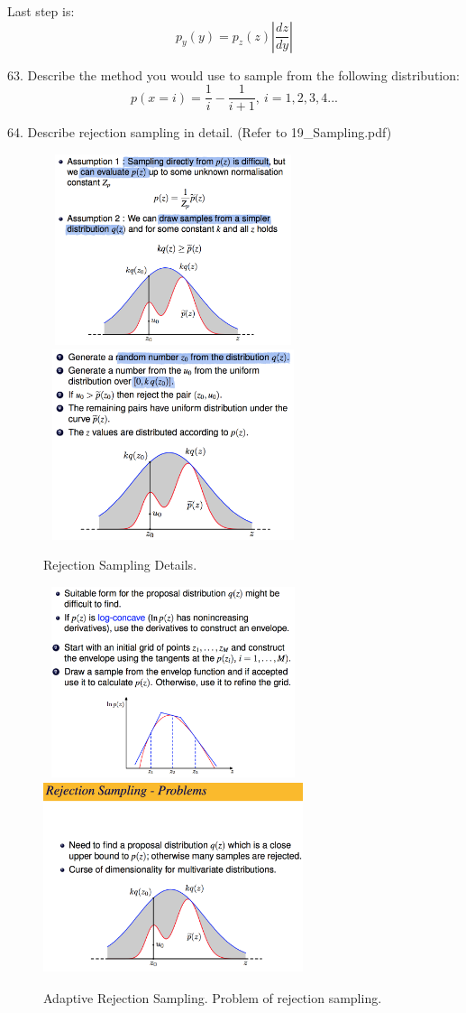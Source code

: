 \documentclass[11pt,a4paper]{article}
\begin{document}
Last step is:
$$ p_y (y) = p_z (z) | \frac{dz}{dy}| $$

63. Describe the method you would use to sample from the following distribution:
$$ p(x=i) = \frac{1}{i} - \frac{1}{i+1},\ i = 1,2,3,4 ...$$

64. Describe rejection sampling in detail. (Refer to 19\_Sampling.pdf)
\begin{figure}[H] \centering
    \includegraphics[width=3in,height=2.2in]{./figure/rejectSampling_1.png}
    \includegraphics[width=3in,height=2.2in]{./figure/rejectSampling_2.png} \\
    \caption{Rejection Sampling Details.}
\end{figure}
\begin{figure}[H] \centering
    \includegraphics[width=3in,height=2.2in]{./figure/rejectSampling_3.png}
    \includegraphics[width=3in,height=2.2in]{./figure/rejectSampling_4.png}
    \caption{Adaptive Rejection Sampling. Problem of rejection sampling.}
\end{figure}
\end{document}
